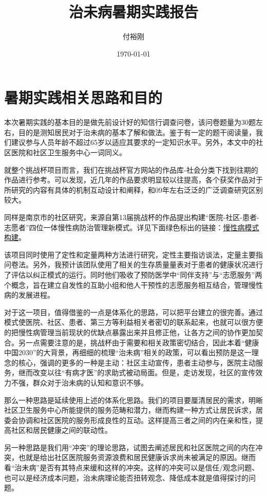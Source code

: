 \documentclass{article}
\author{付裕刚}
\title{治未病暑期实践报告}
\date{\today}
\begin{document}
    \maketitle
    \clearpage
    \section{暑期实践相关思路和目的}
    本次暑期实践的基本目的是做先前设计好的知信行调查问卷，该问卷题量为30题左右，目的是测知居民对于治未病的基本了解和做法。鉴于有一定的题干阅读量，我们建议参与人员年龄不超过65岁以适应其要求的一定知识水平。另外，本文中的社区医院和社区卫生服务中心一词同义。
    
    就整个挑战杯项目而言，我们在挑战杯官方网站的作品库-社会分类下找到往期的作品进行参考。可以发现，近几年的作品要求明显较以往提高，各个获奖作品对于所研究的内容有具体的机制互动设计和阐释，和09年左右泛泛的广泛调查研究区别较大。
    
    同样是南京市的社区研究，来源自第13届挑战杯的作品提出构建“医院-社区-患者-志愿者”四位一体慢性病防治管理新模式。详见下面绿色标出的链接：\href{http://2017.tiaozhanbei.net/d37/project/124/}{慢性病模式构建}。
    
    该项目同时使用了定性和定量两种方法进行研究，定性主要指访谈法，定量主要指问卷法。另外，我预计该团队使用了相关的生存质量量表对于患者的健康状况进行了评估以纠正模式的运行。同时他们吸收了预防医学中“同伴支持”与“志愿服务”两个概念，旨在建立自发性的互助小组和他人干预性的志愿服务相互结合，管理慢性病的发展进程。
    
    对于这一项目，值得借鉴的一点是体系化的思路，可以把平台建立的很完善。通过模式使医院、社区、患者、第三方等利益相关者密切的联系起来，也就可以很方便的把慢性病管理当前现状的优缺点暴露出来并且修正他，让各方之间的协作更加契合。另一点需要注意的是，挑战杯由于需要和相关政策密切结合，因此本着“健康中国2030”的大背景，再细细的梳理“治未病”相关的政策，可以看出预防是这一理念的核心，强调的更多的一种是主动：社区主动宣传，患者主动参与，医院主动服务，继而改变以往“有病才医”的求助式被动局面。但是，走访发现，社区的宣传效力不强，群众对于治未病的认知和意识不够。
    
    那么一种思路是延续使用上述的体系化思路。我们的项目要厘清居民的需求，明晰社区卫生服务中心所能提供的服务范畴和潜力，继而构建一种方式让居民诉求，居委会协调和社区医院的服务形成良性的互动。这样提高三者之间的内在亲和性，提高社区和居民健康之间的联动性。
    
    另一种思路是我们用“冲突”的理论思路，试图去阐述居民和社区医院之间的内在冲突，也就是给出社区医院服务资源浪费和居民健康诉求尚未被满足的原因。继而看“治未病”是否有其特点来缓和这样的冲突。这样的冲突可以是信任/观念问题、也可以是经济成本问题，治未病理论能否扭转观念、降低成本就是值得探讨的问题。
    
\end{document}
